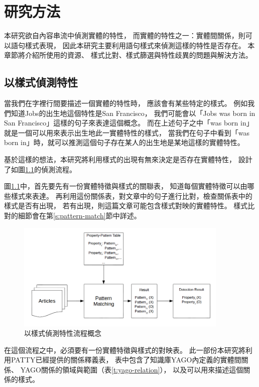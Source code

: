 %
%
%
\chapter{研究方法}
\label{c:method}

本研究欲自內容串流中偵測實體的特性，
而實體的特性之一：實體間關係，則可以語句樣式表現，
因此本研究主要利用語句樣式來偵測這樣的特性是否存在。
本章節將介紹所使用的資源、
樣式比對、樣式篩選與特性歧異的問題與解決方法。

\section{以樣式偵測特性}
當我們在字裡行間要描述一個實體的特性時，
應該會有某些特定的樣式。
例如我們知道Jobs的出生地這個特性是San Francisco，
我們可能會以「Jobs was born in San Francisco」這樣的句子來表達這個概念。
而在上述句子之中「was born in」就是一個可以用來表示出生地此一實體特性的樣式，
當我們在句子中看到「was born in」時，就可以推測這個句子存在某人的出生地是某地這樣的實體特性。

基於這樣的想法，本研究將利用樣式的出現有無來決定是否存在實體特性，
設計了如圖\ref{i:process-v1}的偵測流程。

圖\ref{i:process-v1}中，首先要先有一份實體特徵與樣式的關聯表，
知道每個實體特徵可以由哪些樣式來表達。
再利用這份關係表，對文章中的句子進行比對，檢查關係表中的樣式是否有出現，
若有出現，則這篇文章可能包含樣式對映的實體特性。
樣式比對的細節會在第\ref{s:pattern-match}節中詳述。

\begin{figure}
    \centering
    \includegraphics[width=0.9\textwidth]{images/03-process-v1}
    \caption{以樣式偵測特性流程概念}
    \label{i:process-v1}
\end{figure}

在這個流程之中，必須要有一份實體特徵與樣式的對映表。
此一部份本研究將利用PATTY已經提供的關係釋義表，
表中包含了知識庫YAGO內定義的實體間關係、
YAGO關係的領域與範圍（表\ref{t:yago-relation}），
以及可以用來描述這個關係的樣式。

